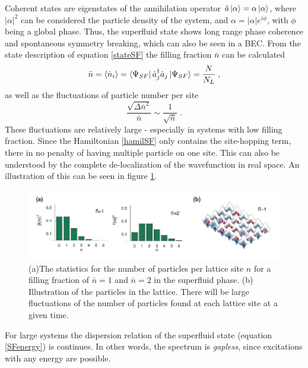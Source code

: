 Coherent states are eigenstates of the annihilation operator $\hat{a} \ket{\alpha} = \alpha \ket{\alpha}$, where $|\alpha |^2$ can be considered the particle density of the system, and $\alpha = |\alpha| e^{i \phi}$, with $\phi$ being a global phase. Thus, the superfluid state shows long range phase coherence and spontaneous symmetry breaking, which can also be seen in a BEC. From the state description of equation \ref{stateSF} the filling fraction $\bar{n}$ can be calculated
\begin{equation}
	\bar{n} = \braket{\hat{n}_i} = \bra{\Psi_{SF}} \hat{a}_{j}^{\dag} \hat{a}_{j} \ket{\Psi_{SF}} = \frac{N}{N_L} \; ,
\end{equation}
as well as the fluctuations of particle number per site
\begin{equation}
	\frac{\sqrt{\Delta \bar{n}^2}}{\bar{n}} \sim \frac{1}{\sqrt{\bar{n}}} \; .
\end{equation}
These fluctuations are relatively large - especially in systems with low filling fraction. Since the Hamiltonian \ref{hamilSF} only contains the site-hopping term, there in no penalty of having multiple particle on one site. This can also be understood by the complete de-localization of the wavefunction in real space. An illustration of this can be seen in figure \ref{fig:f(n)_SF}.\\
\begin{figure}[!h]
	\centering
	\includegraphics[width=0.8\columnwidth]{Figures/f(n)_SF.JPG} 
	\caption{(a)The statistics for the number of particles per lattice site $n$ for a filling fraction of $\bar{n}=1$ and $\bar{n}=2$ in the superfluid phase. (b) Illustration of the particles in the lattice. There will be large fluctuations of the number of particles found at each lattice site at a given time. \cite{greiner}}
	\label{fig:f(n)_SF} 
\end{figure}
For large systems the dispersion relation of the superfluid state (equation \ref{SFenergy}) is continues. In other words, the spectrum is \textit{gapless}, since excitations with any energy are possible.


